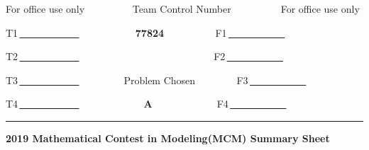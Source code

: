 \thispagestyle{empty}

For office use only \,\,\,\,\,\,\,\,\,\,\,\,\,\,\,\,\,\,\,\,\,\,\,\,\,
Team Control Number \,\,\,\,\,\,\,\,\,\,\,\,\,\,\,\,\,\,\,\,\,\,\,\,\,\,
For office use only

\begin{singlespace}
T1\,\uline{\,\,\,\,\,\,\,\,\,\,\,\,\,\,\,\,\,\,\,\,\,\,\,\,\,\,\,\,\,\,\,\,\,\,
}\textbf{\Large{}\,\,\,\,\,\,\,\,\,\,\,\,\,\,\,\,\,\,\,\,\,\,\,\,\,\,\,\,\,\,\,\,\,\,77824\,\,\,\,\,\,\,\,\,\,\,\,\,\,\,\,\,\,\,\,\,\,\,\,\,\hspace{0.11cm}\,\,\,\,\,\,}F1\,\uline{\,\,\,\,\,\,\,\,\,\,\,\,\,\,\,\,\,\,\,\,\,\,\,\,\,\,\,\,\,\,\,\,\,\, }

T2\,\uline{\,\,\,\,\,\,\,\,\,\,\,\,\,\,\,\,\,\,\,\,\,\,\,\,\,\,\,\,\,\,\,\,\,\,
}\textbf{\Large{}\,\,\,\,\,\,\,\,\,\,\,\,\,\,\,\,\,\,\,\,\,\,\,\,\,\,\,\,\,\,\,\,\,\,\,\,\,\,\,
\,\,\,\,\,\,\,\,\,\,\,\,\,\,\,\,\,\,\,\,\,\,\,\,\,\,\,\,\,\,\,\,\hspace{0.17cm}\,\,\,\,\,\,\,\,}F2\,\uline{\,\,\,\,\,\,\,\,\,\,\,\,\,\,\,\,\,\,\,\,\,\,\,\,\,\,\,\,\,\,\,\,\,\, }

T3\,\uline{\,\,\,\,\,\,\,\,\,\,\,\,\,\,\,\,\,\,\,\,\,\,\,\,\,\,\,\,\,\,\,\,\,\,
}\textbf{\Large{}\,\,\,\,\,\,\,\,\,\,\,\,\,\,\,\,\,\,\,\,\,\,\,\,\,\,\,}Problem
Chosen\textbf{\Large{}\,\,\,\,\,\,\,\,\,\,\,\,\,\,\,\,\,\,\,\,\,\hspace{0.17cm}\,\,\,\,}F3\,\uline{\,\,\,\,\,\,\,\,\,\,\,\,\,\,\,\,\,\,\,\,\,\,\,\,\,\,\,\,\,\,\,\,\,\, }

T4\,\uline{\,\,\,\,\,\,\,\,\,\,\,\,\,\,\,\,\,\,\,\,\,\,\,\,\,\,\,\,\,\,\,\,\,\,
}\textbf{\Large{}\,\,\,\,\,\,\,\,\,\,\,\,\,\,\,\,\,\,\,\,\,\,\,\,\,\,\,\,\,\,\,\,\,\,\,\,\,\,\,A\,\,\,\,\,\,\,\,\,\,\,\,\,\,\,\,\,\,\,\,\,\,\,\,\,\,\,\,\,\,\,\,\,\,\,\,\,\,\,}F4\,\uline{\,\,\,\,\,\,\,\,\,\,\,\,\,\,\,\,\,\,\,\,\,\,\,\,\,\,\,\,\,\,\,\,\,\, }
\end{singlespace}

\noindent \rule{1\columnwidth}{0.5pt}
\noindent \begin{center}
\textbf{2019 Mathematical Contest in Modeling(MCM) Summary Sheet}
\par\end{center}


